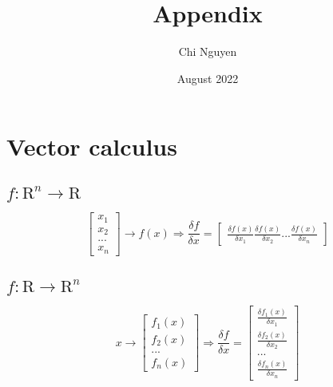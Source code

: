 \documentclass[12pt,letterpaper]{article}
\title{Appendix}
\author{Chi Nguyen}
\date{August 2022}
\begin{document}
\maketitle

\section{Vector calculus}

\subsection{$f: \mathrm{R}^n \rightarrow \mathrm{R}$}
    $$
    \begin{bmatrix}
        x_1\\
        x_2\\
        ...\\
        x_n
    \end{bmatrix}
    \rightarrow
    f(x)
    \Rightarrow
    \frac{\delta f}{\delta x} = \begin{bmatrix}
                                    \frac{\delta f(x)}{\delta x_1}
                                    \frac{\delta f(x)}{\delta x_2}
                                    ...
                                    \frac{\delta f(x)}{\delta x_n}
                                \end{bmatrix}
    $$
    
\subsection{$f: \mathrm{R} \rightarrow \mathrm{R}^n$}
    $$
    x
    \rightarrow
    \begin{bmatrix}
        f_1(x)\\
        f_2(x)\\
        ...\\
        f_n(x)
    \end{bmatrix}
    \Rightarrow
    \frac{\delta f}{\delta x} = \begin{bmatrix}
                                    \frac{\delta f_1(x)}{\delta x_1}\\
                                    \frac{\delta f_2(x)}{\delta x_2}\\
                                    ...\\
                                    \frac{\delta f_n(x)}{\delta x_n}
                                \end{bmatrix}
    $$
    
\end{document}
